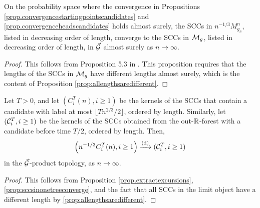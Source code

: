 \begin{proposition}
\label{prop:sccsinonetreeconverge}
On the probability space where the convergence in Propositions \ref{prop.convergencestartingpointscandidates} and \ref{prop.convergenceheadscandidates} holds almost surely, the SCCs in $n^{-1/3}M^n_{g_n}$, listed in decreasing order of length, converge to the SCCs in ${\mathcal M}_g$, listed in decreasing order of length, in $\vec{{\mathcal G}}$ almost surely as $n\to \infty$.
\end{proposition}
\begin{proof}
This follows from Proposition 5.3 in \cite{goldschmidtScalingLimitCritical2021}. This proposition requires that the lengths of the SCCs in ${\mathcal M}_{g}$ have different lengths almost surely, which is the content of Proposition \ref{prop:allengthsaredifferent}. 
\end{proof}

\begin{proposition}
\label{prop:sccordereduptotimeT}
Let $T>0$, and let $(C^T_i(n),i\geq 1)$ be the kernels of the SCCs that contain a candidate with label at most $\lfloor T n^{2/3}/2\rfloor$, ordered by length. Similarly, let $({\mathcal C}^T_i,i\geq 1)$ be the kernels of the SCCs obtained from the out-${\mathbb R}$-forest with a candidate before time $T/2$, ordered by length. Then,
$$\left(n^{-1/3}C^T_i(n), i\geq 1\right) \xrightarrow[]{\mathrm{(d)}} ({\mathcal C}^T_i,i\geq 1)$$
in the $\vec{{\mathcal G}}$-product topology, as $n\to \infty$. 
\end{proposition}
\begin{proof}
This follows from Proposition \ref{prop.extractexcursions}, \cref{prop:sccsinonetreeconverge}, and the fact that all SCCs in the limit object have a different length by \cref{prop:allengthsaredifferent}. 
\end{proof}

